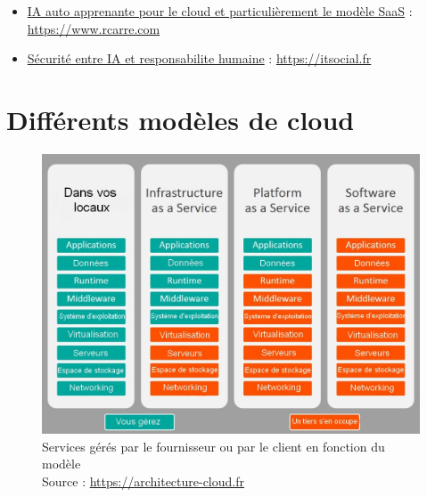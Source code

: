 \documentclass[a4paper, 12pt]{article}
\begin{document}
\begin{itemize}
      \item \href{https://www.rcarre.com/blog/intelligence-artificielle-auto-apprenante-pour-le-cloud-and-saas/}{IA auto apprenante pour le cloud et particulièrement le modèle SaaS} : \url{https://www.rcarre.com}
      \item \href{https://itsocial.fr/partenaires/oracle-partenaire/tribunes-oracle/securite-du-cloud-entre-intelligence-artificielle-et-responsabilite-humaine/}{Sécurité entre IA et responsabilite humaine} : \url{https://itsocial.fr}
    \end{itemize}

    \appendix
      \section{Différents modèles de cloud}
        \begin{figure}[h]
          \centering
          \includegraphics[scale=.4]{img/modeles.jpg}
          \caption{Services gérés par le fournisseur ou par le client en
          fonction du modèle \\ Source : \url{https://architecture-cloud.fr}}
        \end{figure}
        \label{modeles}
\end{document}
